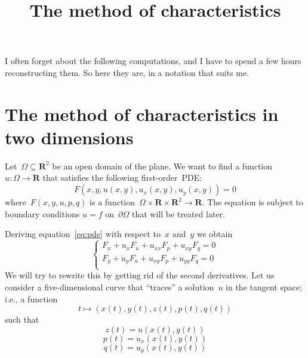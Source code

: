 
\newcommand{\ud}{\mathrm{d}}
\newcommand{\R}{\mathbf{R}}

\title{The method of characteristics}

I often forget about the following computations, and I have to spend a few hours
reconstructing them.
So here they are, in a notation that suits me.

\section{The method of characteristics in two dimensions}


Let~$\Omega\subseteq\R^2$ be an open domain of the plane.
We want to find a function~$u:\Omega\to\R$
that satisfies the following first-order~PDE:
\begin{equation}\label{eq:pde}
		F\left(x,y,u(x,y),u_x(x,y),u_y(x,y)\right)=0
\end{equation}
where~$F(x,y,u,p,q)$ is a function~$\Omega\times\R\times\R^2\to\R$.
The equation is subject to boundary conditions
$u=f$ on~$\partial\Omega$
that will be treated later.

Deriving equation~\ref{eq:pde} with respect to~$x$ and~$y$ we obtain
\begin{equation}\label{eq:gradpde}
	\begin{cases}
		F_x + u_xF_u + u_{xx}F_p + u_{xy}F_q = 0\\
		F_y + u_yF_u + u_{xy}F_p + u_{yy}F_q = 0\\
	\end{cases}
\end{equation}
We will try to rewrite this by getting rid of the second derivatives.  Let us
consider a five-dimensional curve that ``traces'' a solution~$u$ in the
tangent space; i.e., a function
\begin{equation*}
	t\mapsto\left(
		x(t),y(t),z(t),p(t),q(t)
	\right)
\end{equation*}
such that
\begin{equation}
	z(t)=u\left(x(t),y(t)\right)
\end{equation}
\begin{equation}
	p(t)=u_x\left(x(t),y(t)\right)
\end{equation}
\begin{equation}
	q(t)=u_y\left(x(t),y(t)\right)
\end{equation}

